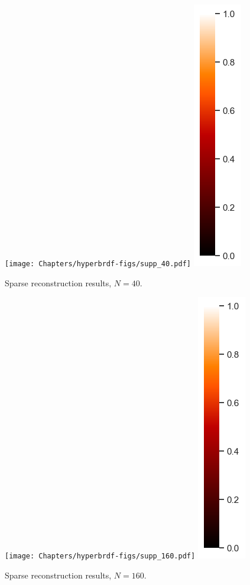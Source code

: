     {%





\begin{figure}
  \centering

  {\texttt{[image: Chapters/hyperbrdf-figs/supp\_40.pdf]}}
  {\includegraphics[width=0.02\linewidth]{Chapters/hyperbrdf-figs/vbar.png}}
   \caption{Sparse reconstruction results, $N = 40$.}
   \label{fig:40}
\end{figure}

\begin{figure}
  \centering

  {\texttt{[image: Chapters/hyperbrdf-figs/supp\_160.pdf]}}
  {\includegraphics[width=0.02\linewidth]{Chapters/hyperbrdf-figs/vbar.png}}
   \caption{Sparse reconstruction results, $N = 160$.}
   \label{fig:160}
\end{figure}

}
